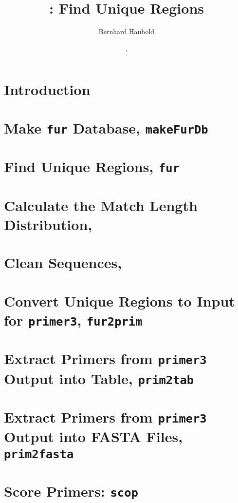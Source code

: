 \documentclass[a4paper]{report}
\begin{document}
\pagestyle{noweb}

\title{: Find Unique Regions}
\author{Bernhard Haubold}
\date{\!\!, }
\maketitle

\tableofcontents

\chapter{Introduction}\label{sec:intro}

\chapter{Make \texttt{fur} Database, \texttt{makeFurDb}}\label{ch:makeFurDb}

\chapter{Find Unique Regions, \texttt{fur}}

\chapter{Calculate the Match Length Distribution, }\label{ch:mad}

\chapter{Clean Sequences, }

\chapter{Convert Unique Regions to Input for \texttt{primer3}, \texttt{fur2prim}}

\chapter{Extract Primers from \texttt{primer3} Output into Table,
  \texttt{prim2tab}}

\chapter{Extract Primers from \texttt{primer3}
Output into FASTA Files, \texttt{prim2fasta}}

\chapter{Score Primers: \texttt{scop}}

\end{document}
